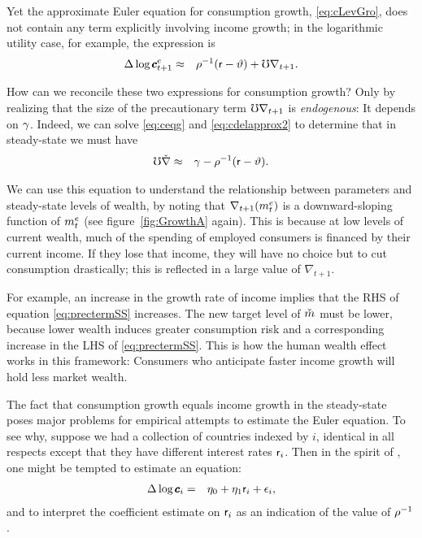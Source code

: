 \documentclass{handout}
\begin{document}
Yet the approximate Euler equation for consumption growth, \eqref{eq:cLevGro}, does 
not contain any term explicitly involving income growth; in the logarithmic utility
case, for example, the expression is
\begin{eqnarray}
         \Delta \log \pmb{c}^{e}_{t+1} & \approx & \rho^{-1}(\mathsf{r}-\vartheta) +  \mho \nabla _{t+1}. \label{eq:cdelapprox2}
\end{eqnarray}

How can we reconcile these two expressions for consumption growth?
Only by realizing that the size of the precautionary term $\mho
\nabla_{t+1}$ is {\it endogenous}: It depends on $\gamma$.  Indeed, we
can solve \eqref{eq:ceqg} and \eqref{eq:cdelapprox2} to determine that
in steady-state we must have 
\begin{eqnarray}
        \mho \check{\nabla} & \approx & \gamma - \rho^{-1}(\mathsf{r}-\vartheta). \label{eq:prectermSS}
\end{eqnarray}

We can use this equation to understand the relationship between
parameters and steady-state levels of wealth, by noting that
$\nabla_{t+1}(m^{e}_{t})$ is a downward-sloping function of
$m^{e}_{t}$ (see figure~\ref{fig:GrowthA} again).  This is because at
low levels of current wealth, much of the spending of employed
consumers is financed by their current income.  If they lose that
income, they will have no choice but to cut consumption drastically; this is
reflected in a large value of $\nabla_{t+1}$.

For example, an increase in the growth rate of income implies that the
RHS of equation \eqref{eq:prectermSS} increases.  The new target level of
$\mTarg^{\null}$ must be lower, because lower wealth induces greater consumption risk and a corresponding increase in the LHS of \eqref{eq:prectermSS}.  This is how the human wealth effect works in this framework:
Consumers who anticipate faster income growth will hold less market wealth.

The fact that consumption growth equals income growth in the
steady-state poses major problems for empirical attempts to estimate
the Euler equation.  To see why, suppose we had a collection of
countries indexed by $i$, identical in all respects except that
they have different interest rates $\mathsf{r}_{i}$.
Then in the spirit of \cite{hallSubstitution}, one might be
tempted to estimate an equation:
\begin{eqnarray}
        \Delta \log \pmb{c}_{i} & = & \eta_{0} + \eta_{1} \mathsf{r}_{i}+\epsilon_{i},
\end{eqnarray}
and to interpret the coefficient estimate on $\mathsf{r}_{i}$ as an indication
of the value of $\rho^{-1}$.
\end{document}
